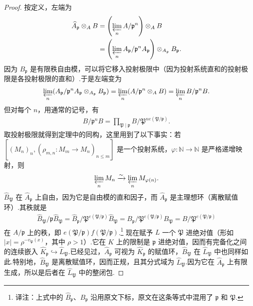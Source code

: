 \begin{proof}
按定义，左端为
\begin{align*}
\widehat A_{\mathfrak p}\otimes_A B
&=\left(\varprojlim_n A/\mathfrak p^n\right)\otimes_A B\\
&=\left(\varprojlim_n A_{\mathfrak p}/\mathfrak p^nA_{\mathfrak p}\right)\otimes_{A_{\mathfrak p}} B_{\mathfrak p}.
\end{align*}
因为 $B_{\mathfrak p}$ 是有限秩自由模，可以将它移入投射极限中（因为投射系统直和的投射极限是各投射极限的直和）.于是左端变为
\begin{align*}
\varprojlim_n(A_{\mathfrak p}/\mathfrak p^nA_{\mathfrak p}\otimes_{A_{\mathfrak p}} B_{\mathfrak p})
=\varprojlim_n(A/\mathfrak p^n\otimes_A B)
=\varprojlim_n B/\mathfrak p^nB.
\end{align*}
但对每个 $n$，用通常的记号，有
\begin{align*}
B/\mathfrak p^nB=\prod_{\mathfrak P\mid\mathfrak p}B/\mathfrak P^{ne(\mathfrak P/\mathfrak p)}.
\end{align*}
取投射极限就得到定理中的同构，这里用到了以下事实：若 $[(M_n)_n,(\rho_{m,n}\colon M_m\longrightarrow M_n)_{n\le m}]$ 是一个投射系统，$\varphi\colon\mathbb N\longrightarrow\mathbb N$ 是严格递增映射，则
\begin{align*}
\varprojlim_n M_n\xrightarrow{\sim}\varprojlim_n M_{\varphi(n)}.
\end{align*}
$\widehat B_{\mathfrak P}$ 在 $\widehat A_{\mathfrak p}$ 上自由，因为它是自由模的直和因子，而 $\widehat A_{\mathfrak p}$ 是主理想环（离散赋值环）.其秩就是
\begin{align*}
\widehat B_{\mathfrak P}/\mathfrak p\widehat B_{\mathfrak P}
=\widehat B_{\mathfrak p}/\mathfrak P^{e(\mathfrak P/\mathfrak p)}\widehat B_{\mathfrak P}
=B_{\mathfrak p}/\mathfrak P^{e(\mathfrak P/\mathfrak p)}B_{\mathfrak P}
=B/\mathfrak P^{e(\mathfrak P/\mathfrak p)}
\end{align*}
在 $A/\mathfrak p$ 上的秩，即 $e(\mathfrak P/\mathfrak p)f(\mathfrak P/\mathfrak p)$.\footnote{译注：上式中的 $\widehat B_{\mathfrak p}$、$B_{\mathfrak p}$ 沿用原文下标，原文在这条等式中混用了 $\mathfrak p$ 和 $\mathfrak P$.}
现在赋予 $L$ 一个 $\mathfrak P$ 进绝对值（形如 $|x|=\rho^{-v_{\mathfrak P}(x)}$，其中 $\rho>1$）.它在 $K$ 上的限制是 $\mathfrak p$ 进绝对值，因而有完备化之间的连续嵌入 $\widehat K_{\mathfrak p}\hookrightarrow\widehat L_{\mathfrak P}$.已经见过，$\widehat A_{\mathfrak p}$ 可视为 $\widehat K_{\mathfrak p}$ 的赋值环，$\widehat B_{\mathfrak P}$ 在 $\widehat L_{\mathfrak P}$ 中也同样如此.特别地，$\widehat B_{\mathfrak P}$ 是离散赋值环，因而正规，且其分式域为 $\widehat L_{\mathfrak P}$.因为它在 $\widehat A_{\mathfrak p}$ 上有限生成，所以是后者在 $\widehat L_{\mathfrak P}$ 中的整闭包.
\end{proof}
